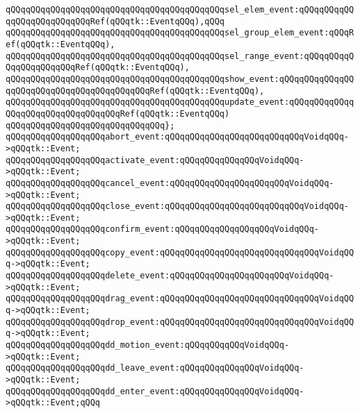 \verb|qQQqqQQqqQQqqQQqqQQqqQQqqQQqqQQqqQQqqQQqqQQqsel_elem_event:qQQqqQQqqQQqqQQqqQQqqQQqqQQqRef(qQQqtk::EventqQQq),qQQq|\newline
\verb|qQQqqQQqqQQqqQQqqQQqqQQqqQQqqQQqqQQqqQQqqQQqsel_group_elem_event:qQQqRef(qQQqtk::EventqQQq),|\newline
\verb|qQQqqQQqqQQqqQQqqQQqqQQqqQQqqQQqqQQqqQQqqQQqsel_range_event:qQQqqQQqqQQqqQQqqQQqqQQqRef(qQQqtk::EventqQQq),|\newline
\verb|qQQqqQQqqQQqqQQqqQQqqQQqqQQqqQQqqQQqqQQqqQQqshow_event:qQQqqQQqqQQqqQQqqQQqqQQqqQQqqQQqqQQqqQQqqQQqRef(qQQqtk::EventqQQq),|\newline
\verb|qQQqqQQqqQQqqQQqqQQqqQQqqQQqqQQqqQQqqQQqqQQqupdate_event:qQQqqQQqqQQqqQQqqQQqqQQqqQQqqQQqqQQqRef(qQQqtk::EventqQQq)|\newline
\verb|qQQqqQQqqQQqqQQqqQQqqQQqqQQqqQQq};|\newline
\newline
\verb|qQQqqQQqqQQqqQQqqQQqabort_event:qQQqqQQqqQQqqQQqqQQqqQQqqQQqVoidqQQq->qQQqtk::Event;|\newline
\verb|qQQqqQQqqQQqqQQqqQQqactivate_event:qQQqqQQqqQQqqQQqVoidqQQq->qQQqtk::Event;|\newline
\verb|qQQqqQQqqQQqqQQqqQQqcancel_event:qQQqqQQqqQQqqQQqqQQqqQQqVoidqQQq->qQQqtk::Event;|\newline
\verb|qQQqqQQqqQQqqQQqqQQqclose_event:qQQqqQQqqQQqqQQqqQQqqQQqqQQqVoidqQQq->qQQqtk::Event;|\newline
\verb|qQQqqQQqqQQqqQQqqQQqconfirm_event:qQQqqQQqqQQqqQQqqQQqVoidqQQq->qQQqtk::Event;|\newline
\verb|qQQqqQQqqQQqqQQqqQQqcopy_event:qQQqqQQqqQQqqQQqqQQqqQQqqQQqqQQqVoidqQQq->qQQqtk::Event;|\newline
\verb|qQQqqQQqqQQqqQQqqQQqdelete_event:qQQqqQQqqQQqqQQqqQQqqQQqVoidqQQq->qQQqtk::Event;|\newline
\verb|qQQqqQQqqQQqqQQqqQQqdrag_event:qQQqqQQqqQQqqQQqqQQqqQQqqQQqqQQqVoidqQQq->qQQqtk::Event;|\newline
\verb|qQQqqQQqqQQqqQQqqQQqdrop_event:qQQqqQQqqQQqqQQqqQQqqQQqqQQqqQQqVoidqQQq->qQQqtk::Event;|\newline
\verb|qQQqqQQqqQQqqQQqqQQqdd_motion_event:qQQqqQQqqQQqVoidqQQq->qQQqtk::Event;|\newline
\verb|qQQqqQQqqQQqqQQqqQQqdd_leave_event:qQQqqQQqqQQqqQQqVoidqQQq->qQQqtk::Event;|\newline
\verb|qQQqqQQqqQQqqQQqqQQqdd_enter_event:qQQqqQQqqQQqqQQqVoidqQQq->qQQqtk::Event;qQQq|\newline
